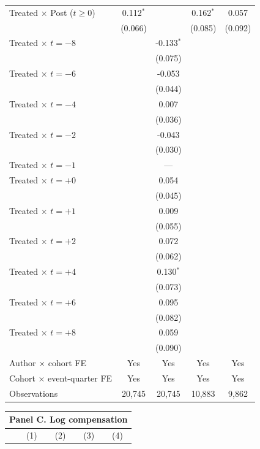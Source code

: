 \begin{center}
\begin{table}
\begin{tabular}{lcccc}
\midrule
\quad Treated $\times$ Post ($t\geq 0$) & 0.112$^{*}$ &  & 0.162$^{*}$ & 0.057 \\
 & (0.066) &  & (0.085) & (0.092) \\
\addlinespace
\quad Treated $\times$ $t=-8$ &  & -0.133$^{*}$ &  &  \\
 &  & (0.075) &  &  \\
\quad Treated $\times$ $t=-6$ &  & -0.053 &  &  \\
 &  & (0.044) &  &  \\
\quad Treated $\times$ $t=-4$ &  & 0.007 &  &  \\
 &  & (0.036) &  &  \\
\quad Treated $\times$ $t=-2$ &  & -0.043 &  &  \\
 &  & (0.030) &  &  \\
\quad Treated $\times$ $t=-1$ & & --- & & \\
\quad Treated $\times$ $t=+0$ &  & 0.054 &  &  \\
 &  & (0.045) &  &  \\
\quad Treated $\times$ $t=+1$ &  & 0.009 &  &  \\
 &  & (0.055) &  &  \\
\quad Treated $\times$ $t=+2$ &  & 0.072 &  &  \\
 &  & (0.062) &  &  \\
\quad Treated $\times$ $t=+4$ &  & 0.130$^{*}$ &  &  \\
 &  & (0.073) &  &  \\
\quad Treated $\times$ $t=+6$ &  & 0.095 &  &  \\
 &  & (0.082) &  &  \\
\quad Treated $\times$ $t=+8$ &  & 0.059 &  &  \\
 &  & (0.090) &  &  \\
\midrule
Author $\times$ cohort FE & Yes & Yes & Yes & Yes \\
Cohort $\times$ event-quarter FE & Yes & Yes & Yes & Yes \\
Observations & 20,745 & 20,745 & 10,883 & 9,862 \\
\bottomrule
\end{tabular}
\end{table}
\begin{table}[t]
\vspace{-9cm}
\begin{tabular}{lcccc}
\multicolumn{5}{l}{\textbf{Panel C. Log compensation}} \\[2pt]
\toprule
 & (1) & (2) & (3) & (4) \\

\end{tabular}
\end{table}
\end{center}
